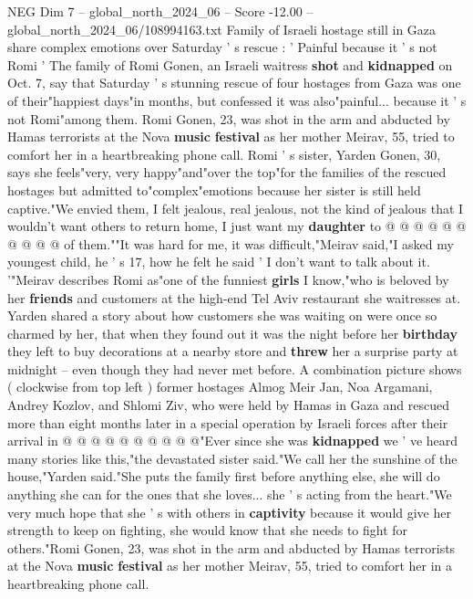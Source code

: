 \begin{textsample}{NEG Dim 7 – global\_north\_2024\_06 – Score -12.00 – global\_north\_2024\_06/108994163.txt}  \label{ex:f7_neg_131}
Family of Israeli hostage still in Gaza share complex emotions over Saturday ' s rescue : ' Painful because it ' s not Romi ' The family of Romi Gonen, an Israeli waitress \textbf{shot} and \textbf{kidnapped} on Oct. 7, say that Saturday ' s stunning rescue of four hostages from Gaza was one of their"happiest days"in months, but confessed it was also"painful... because it ' s not Romi"among them.
Romi Gonen, 23, was shot in the arm and abducted by Hamas terrorists at the Nova \textbf{music} \textbf{festival} as her mother Meirav, 55, tried to comfort her in a heartbreaking phone call.
Romi ' s sister, Yarden Gonen, 30, says she feels"very, very happy"and"over the top"for the families of the rescued hostages but admitted to"complex"emotions because her sister is still held captive."We envied them, I felt jealous, real jealous, not the kind of jealous that I wouldn't want others to return home, I just want my \textbf{daughter} to @ @ @ @ @ @ @ @ @ @ of them.""It was hard for me, it was difficult,"Meirav said,"I asked my youngest child, he ' s 17, how he felt he said ' I don't want to talk about it. '"Meirav describes Romi as"one of the funniest \textbf{girls} I know,"who is beloved by her \textbf{friends} and customers at the high-end Tel Aviv restaurant she waitresses at.
Yarden shared a story about how customers she was waiting on were once so charmed by her, that when they found out it was the night before her \textbf{birthday} they left to buy decorations at a nearby store and \textbf{threw} her a surprise party at midnight -- even though they had never met before.
A combination picture shows ( clockwise from top left ) former hostages Almog Meir Jan, Noa Argamani, Andrey Kozlov, and Shlomi Ziv, who were held by Hamas in Gaza and rescued more than eight months later in a special operation by Israeli forces after their arrival in @ @ @ @ @ @ @ @ @ @"Ever since she was \textbf{kidnapped} we ' ve heard many stories like this,"the devastated sister said."We call her the sunshine of the house,"Yarden said."She puts the family first before anything else, she will do anything she can for the ones that she loves... she ' s acting from the heart."We very much hope that she ' s with others in \textbf{captivity} because it would give her strength to keep on fighting, she would know that she needs to fight for others."Romi Gonen, 23, was shot in the arm and abducted by Hamas terrorists at the Nova \textbf{music} \textbf{festival} as her mother Meirav, 55, tried to comfort her in a heartbreaking phone call.

\end{textsample}
